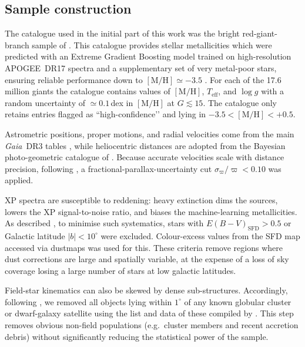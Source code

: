 \documentclass[a4paper,12pt]{article}
\begin{document}
\subsection{Sample construction}
\label{subsec:datasample}

The catalogue used in the initial part of this work was the bright red-giant-branch sample of \citet{Andrae2023}.  
This catalogue provides stellar metallicities which were predicted with an Extreme Gradient Boosting model 
trained on high-resolution \textsc{APOGEE}~DR17 spectra and a supplementary 
set of very metal-poor stars, ensuring reliable performance down to 
$[\mathrm{M/H}]\simeq-3.5$ \citep{Andrae2023}.  
For each of the 17.6\,million giants the catalogue contains values of 
$[\mathrm{M/H}]$, $T_{\mathrm{eff}}$, and $\log g$ with a random uncertainty 
of $\simeq0.1$\,dex in $[\mathrm{M/H}]$ at $G\!\lesssim\!15$.  
The catalogue only retains entries flagged as “high-confidence’’ and lying 
in $-3.5<[\mathrm{M/H}]<+0.5$.

Astrometric positions, proper motions, and radial velocities come from the main 
\textit{Gaia}~DR3 tables \citep{GaiaCollaboration2023}, while heliocentric 
distances are adopted from the Bayesian photo-geometric catalogue of 
\citet{BailerJones2021}.  
Because accurate velocities scale with distance precision, following \citet{zhang2024existencemetalpoordiscmilky},
a fractional-parallax-uncertainty cut $\sigma_{\varpi}/\varpi<0.10$ 
was applied.

XP spectra are susceptible to reddening: heavy extinction dims the sources, 
lowers the XP signal-to-noise ratio, and biases the machine-learning metallicities.  
As described \citet{zhang2024existencemetalpoordiscmilky}, to minimise 
such systematics, stars with $E(B{-}V)_{\mathrm{SFD}}>0.5$ or Galactic latitude 
$|b|<10^{\circ}$ were excluded. Colour-excess values from the SFD map accessed 
via dustmaps \citep{Green2018} was used for this.  
These criteria remove regions where dust corrections are large and spatially 
variable, at the expense of a loss of sky coverage losing a large number of stars 
at low galactic latitudes.

Field-star kinematics can also be skewed by dense sub-structures.  
Accordingly, following \citet{zhang2024existencemetalpoordiscmilky}, we removed 
all objects lying within $1^{\circ}$ of any known globular cluster or 
dwarf-galaxy satellite using the list and data of these compiled by 
\citet{Pace2024}.  
This step removes obvious non-field populations (e.g.\ cluster members and 
recent accretion debris) without significantly reducing the statistical power 
of the sample.
\end{document}
